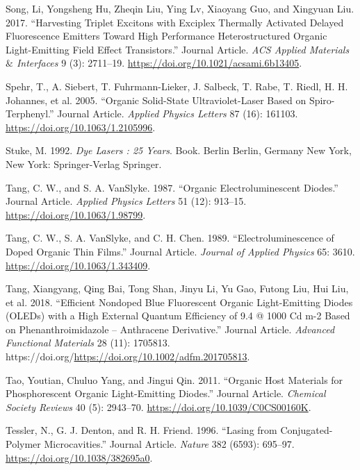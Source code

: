 \documentclass[
  letterpaper,
  DIV=11,
  numbers=noendperiod,
  oneside]{scrreprt}
\newlength{\cslhangindent}
\newlength{\cslentryspacingunit} %
\newenvironment{CSLReferences}[2] %
 {%
  \setlength{\parindent}{0pt}
  \ifodd #1
  \let\oldpar\par
  \def\par{\hangindent=\cslhangindent\oldpar}
  \fi
  \setlength{\parskip}{#2\cslentryspacingunit}
 }%
 {}
\begin{document}
\begin{CSLReferences}{1}{0}
\leavevmode{}%
Song, Li, Yongsheng Hu, Zheqin Liu, Ying Lv, Xiaoyang Guo, and Xingyuan
Liu. 2017. {``Harvesting Triplet Excitons with Exciplex Thermally
Activated Delayed Fluorescence Emitters Toward High Performance
Heterostructured Organic Light-Emitting Field Effect Transistors.''}
Journal Article. \emph{ACS Applied Materials \(\&\) Interfaces} 9 (3):
2711--19. \url{https://doi.org/10.1021/acsami.6b13405}.

\leavevmode{}%
Spehr, T., A. Siebert, T. Fuhrmann-Lieker, J. Salbeck, T. Rabe, T.
Riedl, H. H. Johannes, et al. 2005. {``Organic Solid-State
Ultraviolet-Laser Based on Spiro-Terphenyl.''} Journal Article.
\emph{Applied Physics Letters} 87 (16): 161103.
\url{https://doi.org/10.1063/1.2105996}.

\leavevmode{}%
Stuke, M. 1992. \emph{Dye Lasers : 25 Years}. Book. Berlin Berlin,
Germany New York, New York: Springer-Verlag Springer.

\leavevmode{}%
Tang, C. W., and S. A. VanSlyke. 1987. {``Organic Electroluminescent
Diodes.''} Journal Article. \emph{Applied Physics Letters} 51 (12):
913--15. \url{https://doi.org/10.1063/1.98799}.

\leavevmode{}%
Tang, C. W., S. A. VanSlyke, and C. H. Chen. 1989.
{``Electroluminescence of Doped Organic Thin Films.''} Journal Article.
\emph{Journal of Applied Physics} 65: 3610.
\url{https://doi.org/10.1063/1.343409}.

\leavevmode{}%
Tang, Xiangyang, Qing Bai, Tong Shan, Jinyu Li, Yu Gao, Futong Liu, Hui
Liu, et al. 2018. {``Efficient Nondoped Blue Fluorescent Organic
Light-Emitting Diodes (OLEDs) with a High External Quantum Efficiency of
9.4 @ 1000 Cd m-2 Based on Phenanthroimidazole -- Anthracene
Derivative.''} Journal Article. \emph{Advanced Functional Materials} 28
(11): 1705813.
https://doi.org/\url{https://doi.org/10.1002/adfm.201705813}.

\leavevmode{}%
Tao, Youtian, Chuluo Yang, and Jingui Qin. 2011. {``Organic Host
Materials for Phosphorescent Organic Light-Emitting Diodes.''} Journal
Article. \emph{Chemical Society Reviews} 40 (5): 2943--70.
\url{https://doi.org/10.1039/C0CS00160K}.

\leavevmode{}%
Tessler, N., G. J. Denton, and R. H. Friend. 1996. {``Lasing from
Conjugated-Polymer Microcavities.''} Journal Article. \emph{Nature} 382
(6593): 695--97. \url{https://doi.org/10.1038/382695a0}.


\end{CSLReferences}
\end{document}
